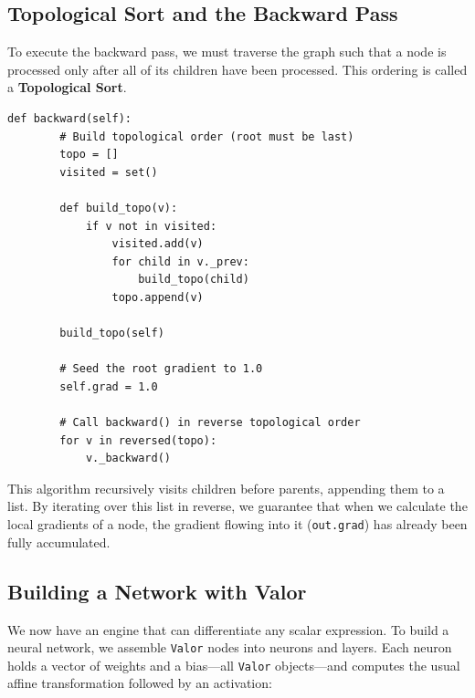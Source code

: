 \documentclass{tufte-handout}
\begin{document}
\subsection{Topological Sort and the Backward Pass}

To execute the backward pass, we must traverse the graph such that a node is processed only after all of its children have been processed. This ordering is called a \textbf{Topological Sort}. 

\begin{lstlisting}[caption={The \texttt{backward} method using topological sort.}]
    def backward(self):
        # Build topological order (root must be last)
        topo = []
        visited = set()
        
        def build_topo(v):
            if v not in visited:
                visited.add(v)
                for child in v._prev:
                    build_topo(child)
                topo.append(v)
                
        build_topo(self)

        # Seed the root gradient to 1.0
        self.grad = 1.0
        
        # Call backward() in reverse topological order
        for v in reversed(topo):
            v._backward()
\end{lstlisting}

This algorithm recursively visits children before parents, appending them to a list. By iterating over this list in reverse, we guarantee that when we calculate the local gradients of a node, the gradient flowing into it (\texttt{out.grad}) has already been fully accumulated.

\subsection{Building a Network with Valor}

We now have an engine that can differentiate any scalar expression. To build a neural network, we assemble \texttt{Valor} nodes into neurons and layers. Each neuron holds a vector of weights and a bias---all \texttt{Valor} objects---and computes the usual affine transformation followed by an activation:
\end{document}
